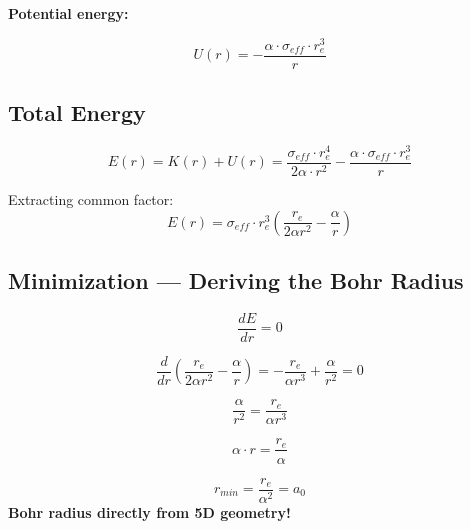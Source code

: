 \documentclass[12pt,a4paper]{article}
\begin{document}
\textbf{Potential energy:}

\begin{keyresult}
\begin{equation}
\boxed{U(r) = -\frac{\alpha \cdot \sigma_{eff} \cdot r_e^3}{r}}
\end{equation}
\end{keyresult}

\subsection{Total Energy}

\begin{equation}
E(r) = K(r) + U(r) = \frac{\sigma_{eff} \cdot r_e^4}{2\alpha \cdot r^2} - \frac{\alpha \cdot \sigma_{eff} \cdot r_e^3}{r}
\end{equation}

Extracting common factor:
\begin{equation}
E(r) = \sigma_{eff} \cdot r_e^3 \left( \frac{r_e}{2\alpha r^2} - \frac{\alpha}{r} \right)
\end{equation}

\subsection{Minimization --- Deriving the Bohr Radius}

\begin{equation}
\frac{dE}{dr} = 0
\end{equation}

\begin{equation}
\frac{d}{dr} \left( \frac{r_e}{2\alpha r^2} - \frac{\alpha}{r} \right) = -\frac{r_e}{\alpha r^3} + \frac{\alpha}{r^2} = 0
\end{equation}

\begin{equation}
\frac{\alpha}{r^2} = \frac{r_e}{\alpha r^3}
\end{equation}

\begin{equation}
\alpha \cdot r = \frac{r_e}{\alpha}
\end{equation}

\begin{keyresult}
\begin{equation}
\boxed{r_{min} = \frac{r_e}{\alpha^2} = a_0}
\end{equation}
\textbf{Bohr radius directly from 5D geometry!}
\end{keyresult}
\end{document}
